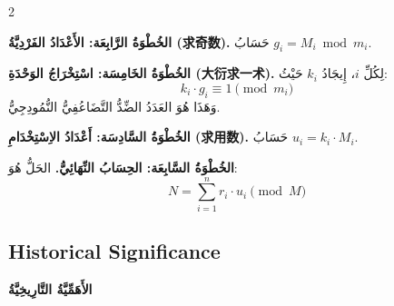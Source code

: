 \documentclass[11pt,a4paper]{article}
\newcommand{\ar}[1]{\arabicfont\beginR #1\endR}
\newenvironment{bilingual}{%
  \begin{paracol}{2}
}{%
  \end{paracol}
}
\begin{document}
\begin{bilingual}
\begin{rightcolumn*}
\ar{\textbf{الخُطْوَةُ الرَّابِعَة: الأَعْدَادُ الفَرْدِيَّةُ (求奇数).} حَسَابُ $g_i = M_i \bmod m_i$.}

\ar{\textbf{الخُطْوَةُ الخَامِسَة: اسْتِخْرَاجُ الوَحْدَةِ (大衍求一术).} لِكُلِّ $i$، إِيجَادُ $k_i$ حَيْثُ:}
\[k_i \cdot g_i \equiv 1 \pmod{m_i}\]
\ar{وَهَذَا هُوَ العَدَدُ الضِّدُّ التَّضَاعُفِيُّ النُّمُودِجِيُّ.}

\ar{\textbf{الخُطْوَةُ السَّادِسَة: أَعْدَادُ الاِسْتِخْدَامِ (求用数).} حَسَابُ $u_i = k_i \cdot M_i$.}

\ar{\textbf{الخُطْوَةُ السَّابِعَة: الحِسَابُ النِّهَائِيُّ.} الحَلُّ هُوَ:}
\[N = \sum_{i=1}^{n} r_i \cdot u_i \pmod{M}\]
\end{rightcolumn*}

\end{bilingual}

\vspace{1em}

\subsection{Historical Significance}
\ar{\textbf{الأَهَمِّيَّةُ التَّارِيخِيَّةُ}}
\end{document}
